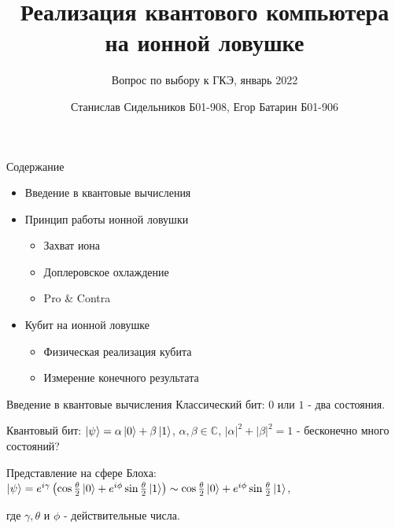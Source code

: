 \documentclass{beamer}
\title{Реализация квантового компьютера на ионной ловушке}
\subtitle{Вопрос по выбору к ГКЭ, январь 2022}
\author{Станислав Сидельников Б01-908, Егор Батарин Б01-906}
\institute{Московский физико-технический институт}
\date{}
\begin{document}
    
    \begin{frame}
        \titlepage
    \end{frame}

    \begin{frame}{Содержание}

        \begin{itemize}

            \item<1-> Введение в квантовые вычисления

      

            \item<2-> Принцип работы ионной ловушки

                \begin{itemize}
                    \item{Захват иона}
                    \item{Доплеровское охлаждение}
                    \item{Pro \& Contra}
                \end{itemize}

            \item<3-> Кубит на ионной ловушке

                \begin{itemize}


                    \item{Физическая реализация кубита}
                    \item{Измерение конечного результата}

                \end{itemize}
            
            \end{itemize}

                
        \end{frame}

	\begin{frame}{Введение в квантовые вычисления}
		Классический бит: $0$ или $1$ - два состояния.
		\vspace{3mm}
		
		Квантовый бит: $\ket{\psi} = \alpha\ket{0} + \beta\ket{1}$, $\alpha,\beta \in \mathbb{C}$, $|\alpha|^2 + |\beta|^2 = 1$ - бесконечно много состояний?
		\vspace{3mm}
		
		Представление на сфере Блоха: $\ket{\psi} = e^{i\gamma}\left(  \cos{\frac{\theta}{2}}\ket{0}+e^{i\phi}\sin{\frac{\theta}{2}} \ket{1}  \right) \sim \cos{\frac{\theta}{2}}\ket{0}+e^{i\phi}\sin{\frac{\theta}{2}} \ket{1} $,
		
		где $\gamma, \theta$ и $\phi$ - действительные числа.
	\end{frame}
	
\end{document}
